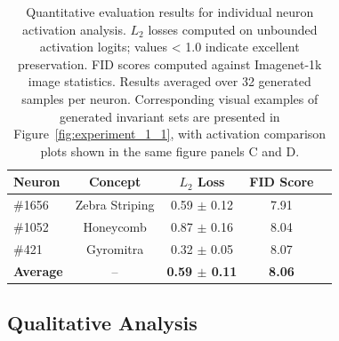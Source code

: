 \begin{table}[h!]
\centering
\begin{tabular}{lcccc}
\toprule
\textbf{Neuron} & \textbf{Concept} & \textbf{$L_2$ Loss} & \textbf{FID Score}\\
\midrule
\#1656 & Zebra Striping & 0.59 $\pm$ 0.12 & 7.91 \\
\#1052 & Honeycomb & 0.87 $\pm$ 0.16 & 8.04\\
\#421 & Gyromitra & 0.32 $\pm$ 0.05 & 8.07\\
\midrule
\textbf{Average} & -- & \textbf{0.59 $\pm$ 0.11} & \textbf{8.06}  \\
\bottomrule
\end{tabular}
\caption{Quantitative evaluation results for individual neuron activation analysis. $L_2$ losses computed on unbounded activation logits; values < 1.0 indicate excellent preservation. FID scores computed against Imagenet-1k image statistics. Results averaged over 32 generated samples per neuron. Corresponding visual examples of generated invariant sets are presented in Figure~\ref{fig:experiment_1_1}, with activation comparison plots shown in the same figure panels C and D.}
\label{tab:neuron_results}
\end{table}

\subsection{Qualitative Analysis}

